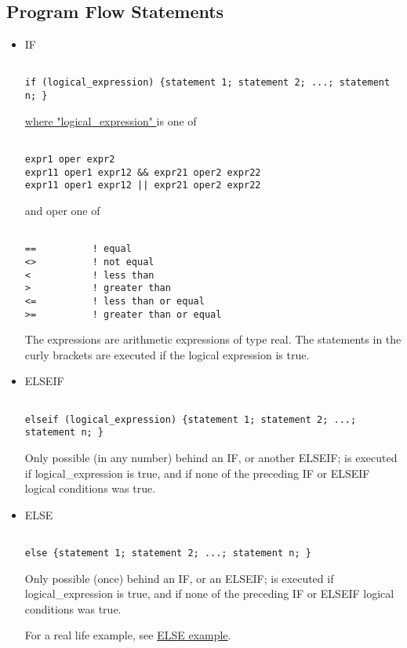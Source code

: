
\subsection{Program Flow Statements}

\begin{itemize}
	\item IF
\begin{verbatim}

if (logical_expression) {statement 1; statement 2; ...; statement n; }
\end{verbatim}
\href{logical}{ where "logical\_expression" } is one of 
\begin{verbatim}

expr1 oper expr2
expr11 oper1 expr12 && expr21 oper2 expr22
expr11 oper1 expr12 || expr21 oper2 expr22
\end{verbatim} 
and oper one of 
\begin{verbatim}

==          ! equal
<>          ! not equal
<           ! less than
>           ! greater than
<=          ! less than or equal
>=          ! greater than or equal
\end{verbatim} 
The expressions are arithmetic expressions of type real. The statements
in the curly brackets are executed if the logical expression is true.  


	\item ELSEIF%
\begin{verbatim}

elseif (logical_expression) {statement 1; statement 2; ...; statement n; }
\end{verbatim} 
Only possible (in any number) behind an IF, or another ELSEIF; is
executed if  logical\_expression is true, and if none of the preceding
IF or ELSEIF logical conditions was true.  


	\item ELSE%
\begin{verbatim}

else {statement 1; statement 2; ...; statement n; }
\end{verbatim} 
Only possible (once) behind an IF, or an ELSEIF; is executed if
logical\_expression is true, and if none of the preceding IF or ELSEIF
logical conditions was true.  

For a real life example, see \href{foot.html}{ELSE example}. 



\end{itemize}
